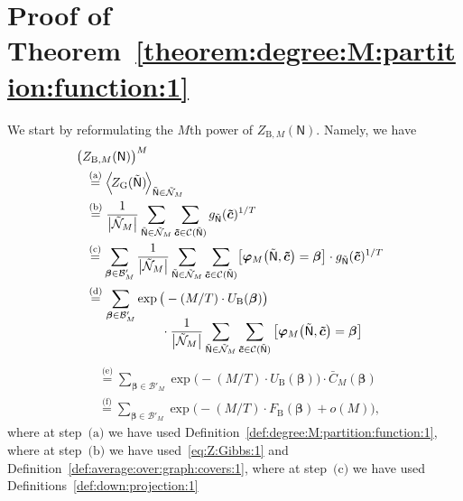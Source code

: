 \documentclass[journal, twocolumn]{IEEEtran}
\renewcommand{\mathbf}[1]{{\bm{#1}}}
\newcommand{\vect}[1]{\mathbf{#1}}
\newcommand{\code}[1]{\mathcal{#1}}
\newcommand{\set}[1]{\mathcal{#1}}
\newcommand{\graph}[1]{\mathsf{#1}}
\newcommand{\onestareq}{\overset{\text{(a)}}{=}}
\newcommand{\twostarseq}{\overset{\text{(b)}}{=}}
\newcommand{\threestarseq}{\overset{\text{(c)}}{=}}
\newcommand{\fourstarseq}{\overset{\text{(d)}}{=}}
\newcommand{\fivestarseq}{\overset{\text{(e)}}{=}}
\newcommand{\sixstarseq}{\overset{\text{(f)}}{=}}
\newcommand{\onestar}{\text{(a)}}
\newcommand{\twostars}{\text{(b)}}
\newcommand{\threestars}{\text{(c)}}
\newcommand{\codeCedge}{\code{C}}
\newcommand{\bel}{\beta}
\newcommand{\vbel}{\boldsymbol{\bel}}
\newcommand{\cvc}{\vect{\cover{c}}}
\newcommand{\lmpBdown}[1]{\mathcal{B}'_{#1}}
\newcommand{\graphN}{\graph{N}}
\newcommand{\FBethe}{F_{\mathrm{B}}}
\newcommand{\UBethe}{U_{\mathrm{B}}}
\newcommand{\ZBetheM}[1]{Z_{\mathrm{B}, #1}}
\newcommand{\cover}[1]{\tilde{#1}}
\newcommand{\cset}[1]{\cover{\set{#1}}}
\newcommand{\cgraph}[1]{\cover{\graph{#1}}}
\newcommand{\cardbig}[1]{\big\lvert #1 \big\rvert}
\newcommand{\?}{\mathrm{?}}
\newcommand{\varphiM}{\boldsymbol{\varphi}_{M}}
\newcommand{\ZGibbs}{Z_{\mathrm{G}}}
\begin{document}
\section{Proof of Theorem~\ref{theorem:degree:M:partition:function:1}}
\label{sec:proof:theorem:degree:M:partition:function:1}


We start by reformulating the $M$th power of $\ZBetheM{M}(\graphN)$. Namely,
we have
\begin{align}
  &
  \hskip-0.25cm
  \big(
    \ZBetheM{M}(\graphN)
  \big)^M \nonumber \\
    &\onestareq
       \Big\langle \!
         \ZGibbs(\cgraph{N})
       \! \Big\rangle_{\cgraph{N} \in \cset{N}_{M}} \nonumber \\
    &\twostarseq
       \frac{1}{\cardbig{\cset{N}_M}}
         \sum_{\cgraph{N} \in \cset{N}_M}
           \sum_{\cvc \in \codeCedge(\cgraph{N})}
             g_{\cgraph{N}}(\cvc)^{1/T} \nonumber \\
    &\threestarseq
       \sum_{\vbel \in \lmpBdown{M}}
         \frac{1}{\cardbig{\cset{N}_M}}
         \sum_{\cgraph{N} \in \cset{N}_M}
           \sum_{\cvc \in \codeCedge(\cgraph{N})}
             \!
             \left[ \varphiM\big( \cgraph{N},\cvc \big) = \vbel \right]
             \cdot
             g_{\cgraph{N}}(\cvc)^{1/T} \nonumber \\
    &\fourstarseq
       \sum_{\vbel \in \lmpBdown{M}}
         \exp\big( - (M/T) \cdot \UBethe(\vbel) \big)
           \nonumber \\[-0.25cm]
    &\quad\quad\quad\quad\quad\quad
         \cdot
         \frac{1}{\cardbig{\cset{N}_M}}
         \sum_{\cgraph{N} \in \cset{N}_M}
           \sum_{\cvc \in \codeCedge(\cgraph{N})}
             \left[ \varphiM\big( \cgraph{N},\cvc \big) = \vbel \right]
               \nonumber
  \end{align}
  \begin{align}
    &\fivestarseq
       \sum_{\vbel \in \lmpBdown{M}}
         \exp\big( - (M/T) \cdot \UBethe(\vbel) \big)
         \cdot
         \bar C_M(\vbel) \nonumber \\
    &\sixstarseq
       \sum_{\vbel \in \lmpBdown{M}}
         \exp\big( - (M/T) \cdot \FBethe(\vbel) + o(M) \big),
           \label{eq:ZBethe:power:1}
\end{align}
where at step~$\onestar$ we have used
Definition~\ref{def:degree:M:partition:function:1}, where at step~$\twostars$
we have used~\eqref{eq:Z:Gibbs:1} and
Definition~\ref{def:average:over:graph:covers:1}, where at step~$\threestars$
we have used Definitions~\ref{def:down:projection:1}
\end{document}
